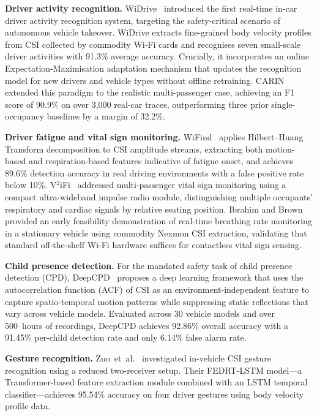 \documentclass[english,bibtex]{kththesis}
\begin{document}
\textbf{Driver activity recognition.}
WiDrive~\cite{bai2019widrive} introduced the first real-time in-car driver activity recognition system, targeting the safety-critical scenario of autonomous vehicle takeover. WiDrive extracts fine-grained body velocity profiles from CSI collected by commodity Wi-Fi cards and recognises seven small-scale driver activities with 91.3\% average accuracy. Crucially, it incorporates an online Expectation-Maximisation adaptation mechanism that updates the recognition model for new drivers and vehicle types without offline retraining. CARIN~\cite{bai2020carin} extended this paradigm to the realistic multi-passenger case, achieving an F1 score of 90.9\% on over 3{,}000 real-car traces, outperforming three prior single-occupancy baselines by a margin of 32.2\%.

\textbf{Driver fatigue and vital sign monitoring.}
WiFind~\cite{jia2020wifind} applies Hilbert--Huang Transform decomposition to CSI amplitude streams, extracting both motion-based and respiration-based features indicative of fatigue onset, and achieves 89.6\% detection accuracy in real driving environments with a false positive rate below 10\%. V$^2$iFi~\cite{zheng2020v2ifi} addressed multi-passenger vital sign monitoring using a compact ultra-wideband impulse radio module, distinguishing multiple occupants' respiratory and cardiac signals by relative seating position. Ibrahim and Brown~\cite{ibrahim2021vehicle} provided an early feasibility demonstration of real-time breathing rate monitoring in a stationary vehicle using commodity Nexmon CSI extraction, validating that standard off-the-shelf Wi-Fi hardware suffices for contactless vital sign sensing.

\textbf{Child presence detection.}
%
For the mandated safety task of child presence detection (CPD), DeepCPD~\cite{jayaweera2025deepcpd} proposes a deep learning framework that uses the autocorrelation function (ACF) of CSI as an environment-independent feature to capture spatio-temporal motion patterns while suppressing static reflections that vary across vehicle models. Evaluated across 30 vehicle models and over 500~hours of recordings, DeepCPD achieves 92.86\% overall accuracy with a 91.45\% per-child detection rate and only 6.14\% false alarm rate.

\textbf{Gesture recognition.}
Zuo~et~al.~\cite{zuo2024invehicle} investigated in-vehicle CSI gesture recognition using a reduced two-receiver setup. Their FEDRT-LSTM model---a Transformer-based feature extraction module combined with an LSTM temporal classifier---achieves 95.54\% accuracy on four driver gestures using body velocity profile data.
\end{document}
